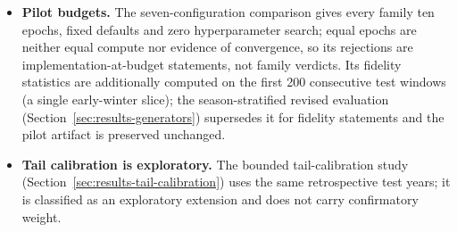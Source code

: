 \begin{itemize}
    which both reduces its unit count and weakens any generator fitted to it.
    \item \textbf{Pilot budgets.} The seven-configuration comparison gives every
    family ten epochs, fixed defaults and zero hyperparameter search; equal
    epochs are neither equal compute nor evidence of convergence, so its
    rejections are implementation-at-budget statements, not family verdicts.
    Its fidelity statistics are additionally computed on the first 200
    consecutive test windows (a single early-winter slice); the
    season-stratified revised evaluation
    (Section~\ref{sec:results-generators}) supersedes it for fidelity
    statements and the pilot artifact is preserved unchanged.
    \item \textbf{Tail calibration is exploratory.} The bounded
    tail-calibration study (Section~\ref{sec:results-tail-calibration}) uses
    the same retrospective test years; it is classified as an exploratory
    extension and does not carry confirmatory weight.
\end{itemize}
